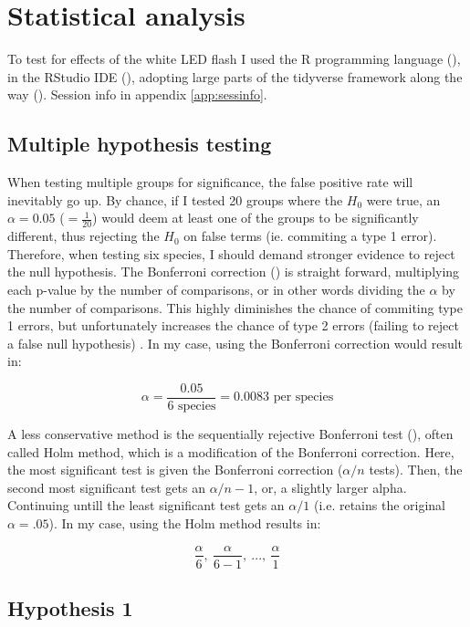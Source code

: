 \section{Statistical analysis} %

To test for effects of the white LED flash I used the R programming language (\cite{RCoreTeam2020}), in the RStudio IDE (\cite{RStudioTeam2020a}), adopting large parts of the tidyverse framework along the way (\cite{tidyverse}). Session info in appendix \ref{app:sessinfo}.

\subsection*{Multiple hypothesis testing}
When testing multiple groups for significance, the false positive rate will inevitably go up. 
By chance, if I tested 20 groups where the $H_{0}$ were true, an $\alpha = 0.05$ 
($ =  \frac{1}{20} $) 
would deem at least one of the groups to be significantly different, thus rejecting the $H_{0}$ on false terms (ie. commiting a type 1 error).
Therefore, when testing six species, I should demand stronger evidence to reject the null hypothesis.
The Bonferroni correction (\cite{Holm1979}) is straight forward, multiplying each p-value by the number of comparisons, or in other words dividing the $\alpha$ by the number of comparisons. This highly diminishes the chance of commiting type 1 errors, but unfortunately increases the chance of type 2 errors (failing to reject a false null hypothesis) \cite{Shaffer1995}. 
In my case, using the Bonferroni correction would result in:

 $$ \alpha = \frac{0.05}{ 6 \mbox{\ species} } = 0.0083 \mbox{\ per species} $$ 


A less conservative method is the sequentially rejective Bonferroni test (\cite{Holm1979}), often called Holm method, which is a modification of the Bonferroni correction. Here, the most significant test is given the Bonferroni correction ($\alpha /n$ tests).
Then, the second most significant test gets an $\alpha / n - 1$, or, a slightly larger alpha.
Continuing untill the least significant test gets an $\alpha / 1$ (i.e. retains the original $\alpha = .05$). In my case, using the Holm method results in:

 $$ \frac{\alpha}{6},\ \frac{\alpha}{6-1},\ ...,\ \frac{\alpha}{1} $$


	\subsection*{Hypothesis 1}

